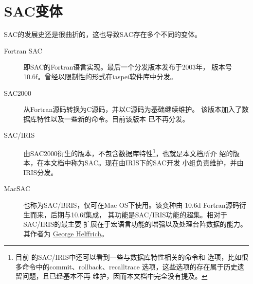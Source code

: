 \section{SAC变体}

SAC的发展史还是很曲折的，这也导致SAC存在多个不同的变体。

\begin{description}
\item[Fortran SAC]  即SAC的Fortran语言实现。最后一个分发版本发布于2003年，
                    版本号10.6f。曾经以限制性的形式在iaspei软件库中分发。
\item[SAC2000]      从Fortran源码转换为C源码，并以C源码为基础继续维护。
                    该版本加入了数据库特性以及一些新的命令。目前该版本
                    已不再分发。
\item[SAC/IRIS]     由SAC2000衍生的版本，不包含数据库特性\footnote{目前
                    的SAC/IRIS中还可以看到一些与数据库特性相关的命令和
                    选项，比如很多命令中的commit、rollback、recalltrace
                    选项，这些选项的存在属于历史遗留问题，且已经基本不再
                    维护，因而本文档中完全没有提及。}，也就是本文档所介
                    绍的版本，在本文档中称为SAC。现在由IRIS下的SAC开发
                    小组负责维护，并由IRIS分发。
\item[MacSAC]       也称为SAC/BRIS，仅可在Mac OS下使用。该变种由
                    10.6d Fortran源码衍生而来，后期与10.6f集成，
                    其功能是SAC/IRIS功能的超集。相对于SAC/IRIS的最主要
                    扩展在于宏语言功能的增强以及处理台阵数据的能力。
                    其作者为
                    \href{http://www1.gly.bris.ac.uk/~george/gh.html}{George Helffrich}。
\end{description}
